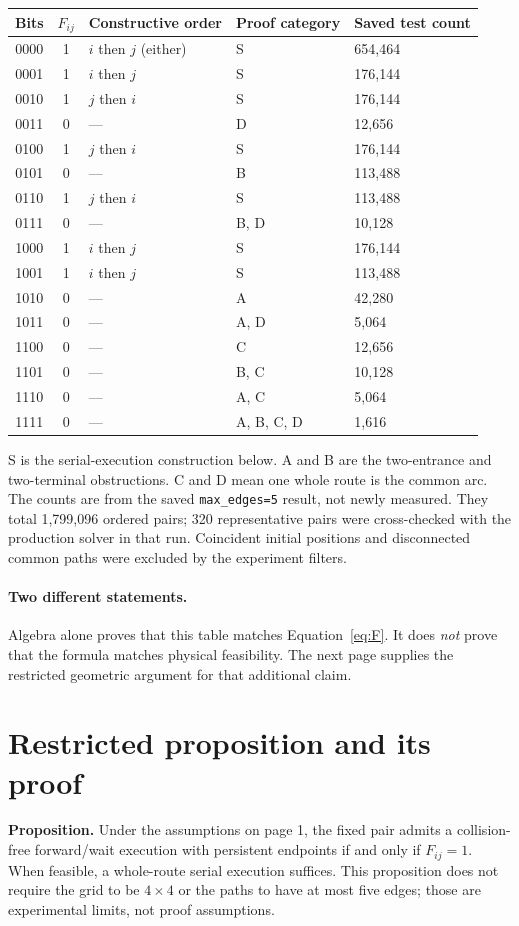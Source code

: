 \documentclass[11pt,a4paper]{article}
\begin{document}
\begin{center}
\begin{tabular}{cclll}\toprule
Bits & $F_{ij}$ & Constructive order & Proof category & Saved test count\\\midrule
0000 & 1 & $i$ then $j$ (either) & S & 654,464\\
0001 & 1 & $i$ then $j$ & S & 176,144\\
0010 & 1 & $j$ then $i$ & S & 176,144\\
0011 & 0 & --- & D & 12,656\\
0100 & 1 & $j$ then $i$ & S & 176,144\\
0101 & 0 & --- & B & 113,488\\
0110 & 1 & $j$ then $i$ & S & 113,488\\
0111 & 0 & --- & B, D & 10,128\\
1000 & 1 & $i$ then $j$ & S & 176,144\\
1001 & 1 & $i$ then $j$ & S & 113,488\\
1010 & 0 & --- & A & 42,280\\
1011 & 0 & --- & A, D & 5,064\\
1100 & 0 & --- & C & 12,656\\
1101 & 0 & --- & B, C & 10,128\\
1110 & 0 & --- & A, C & 5,064\\
1111 & 0 & --- & A, B, C, D & 1,616\\\bottomrule
\end{tabular}
\end{center}
S is the serial-execution construction below. A and B are the two-entrance and
two-terminal obstructions. C and D mean one whole route is the common arc.
The counts are from the saved \texttt{max\_edges=5} result, not newly measured.
They total 1,799,096 ordered pairs; 320 representative pairs were cross-checked
with the production solver in that run. Coincident initial positions and
disconnected common paths were excluded by the experiment filters.

\paragraph{Two different statements.}
Algebra alone proves that this table matches Equation~\eqref{eq:F}. It does
\emph{not} prove that the formula matches physical feasibility. The next page
supplies the restricted geometric argument for that additional claim.

\clearpage
\section{Restricted proposition and its proof}
\textbf{Proposition.} Under the assumptions on page 1, the fixed pair admits
a collision-free forward/wait execution with persistent endpoints if and only
if $F_{ij}=1$. When feasible, a whole-route serial execution suffices.
This proposition does not require the grid to be $4\times4$ or the paths to
have at most five edges; those are experimental limits, not proof assumptions.
\end{document}
